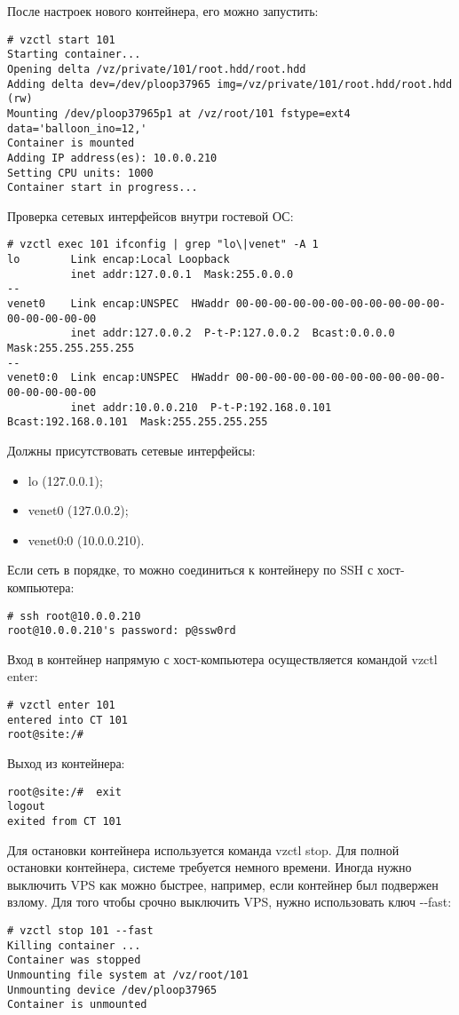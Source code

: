 После настроек нового контейнера, его можно запустить:
\begin{lstlisting}
# vzctl start 101
Starting container...
Opening delta /vz/private/101/root.hdd/root.hdd
Adding delta dev=/dev/ploop37965 img=/vz/private/101/root.hdd/root.hdd (rw)
Mounting /dev/ploop37965p1 at /vz/root/101 fstype=ext4 data='balloon_ino=12,'
Container is mounted
Adding IP address(es): 10.0.0.210
Setting CPU units: 1000
Container start in progress...
\end{lstlisting}

Проверка сетевых интерфейсов внутри гостевой ОС:
\begin{lstlisting}
# vzctl exec 101 ifconfig | grep "lo\|venet" -A 1
lo        Link encap:Local Loopback
          inet addr:127.0.0.1  Mask:255.0.0.0
--
venet0    Link encap:UNSPEC  HWaddr 00-00-00-00-00-00-00-00-00-00-00-00-00-00-00-00
          inet addr:127.0.0.2  P-t-P:127.0.0.2  Bcast:0.0.0.0  Mask:255.255.255.255
--
venet0:0  Link encap:UNSPEC  HWaddr 00-00-00-00-00-00-00-00-00-00-00-00-00-00-00-00
          inet addr:10.0.0.210  P-t-P:192.168.0.101  Bcast:192.168.0.101  Mask:255.255.255.255
\end{lstlisting}

Должны присутствовать сетевые интерфейсы:
\begin{itemize}
    \item lo (127.0.0.1);
    \item venet0 (127.0.0.2);
    \item venet0:0 (10.0.0.210).
\end{itemize}

Если сеть в порядке, то можно соединиться к контейнеру по SSH с хост-компьютера:
\begin{lstlisting}
# ssh root@10.0.0.210
root@10.0.0.210's password: p@ssw0rd
\end{lstlisting}

Вход в контейнер напрямую с хост-компьютера осуществляется командой vzctl enter:
\begin{lstlisting}
# vzctl enter 101
entered into CT 101
root@site:/#
\end{lstlisting}

Выход из контейнера:
\begin{lstlisting}
root@site:/#  exit
logout
exited from CT 101
\end{lstlisting}

Для остановки контейнера используется команда vzctl stop.
Для полной остановки контейнера, системе требуется немного времени.
Иногда нужно выключить VPS как можно быстрее, например, если контейнер был подвержен взлому.
Для того чтобы срочно выключить VPS, нужно использовать ключ -{}-fast:
\begin{lstlisting}
# vzctl stop 101 --fast
Killing container ...
Container was stopped
Unmounting file system at /vz/root/101
Unmounting device /dev/ploop37965
Container is unmounted
\end{lstlisting}

